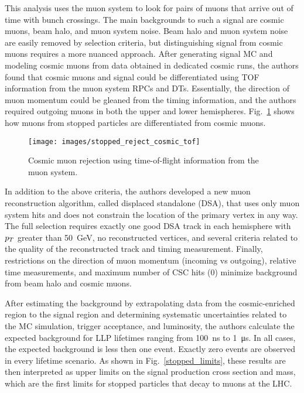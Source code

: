 \documentclass[12pt]{article}
\begin{document}
        This analysis uses the muon system to look for pairs of muons that arrive out of time with bunch crossings. The main backgrounds to such a signal are cosmic muons, beam halo, and muon system noise. Beam halo and muon system noise are easily removed by selection criteria, but distinguishing signal from cosmic muons requires a more nuanced approach. After generating signal MC and modeling cosmic muons from data obtained in dedicated cosmic runs, the authors found that cosmic muons and signal could be differentiated using TOF information from the muon system RPCs and DTs. Essentially, the direction of muon momentum could be gleaned from the timing information, and the authors required outgoing muons in both the upper and lower hemispheres. Fig.~\ref{stopped_muon_differentiation} shows how muons from stopped particles are differentiated from cosmic muons.
        
        \noindent \begin{figure}[htbp] \begin{center}
        \texttt{[image: images/stopped\_reject\_cosmic\_tof]}
            \caption{Cosmic muon rejection using time-of-flight information from the muon system.~\cite{cms_stopped}}
        \label{stopped_muon_differentiation}
        \end{center} \end{figure}

        In addition to the above criteria, the authors developed a new muon reconstruction algorithm, called displaced standalone (DSA), that uses only muon system hits and does not constrain the location of the primary vertex in any way. The full selection requires exactly one good DSA track in each hemisphere with $p_T$ greater than \SI{50}{\giga\electronvolt}, no reconstructed vertices, and several criteria related to the quality of the reconstructed track and timing measurement. Finally, restrictions on the direction of muon momentum (incoming vs outgoing), relative time measurements, and maximum number of CSC hits (0) minimize background from beam halo and cosmic muons.

        After estimating the background by extrapolating data from the cosmic-enriched region to the signal region and determining systematic uncertainties related to the MC simulation, trigger acceptance, and luminosity, the authors calculate the expected background for LLP lifetimes ranging from \SI{100}{\nano\s} to \SI{1}{\micro\s}. In all cases, the expected background is less then one event. Exactly zero events are observed in every lifetime scenario. As shown in Fig.~\ref{stopped_limits}, these results are then interpreted as upper limits on the signal production cross section and mass, which are the first limits for stopped particles that decay to muons at the LHC.
\end{document}
